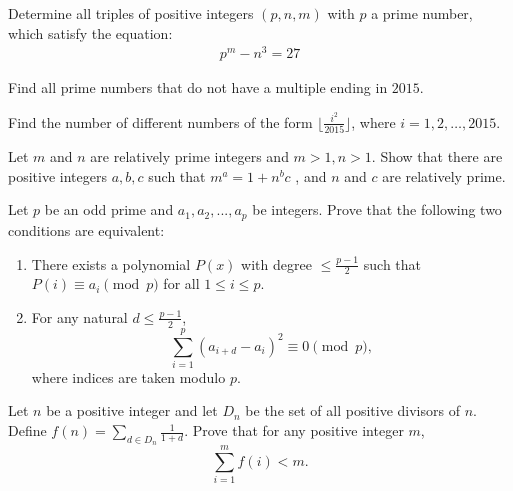 \documentclass[problems.tex]{subfile}
\begin{document}
	\begin{problem}[Chile 2016]
		Determine all triples of positive integers $(p, n, m)$ with $p$ a prime number, which satisfy the equation:
		\begin{align*}
			p^m - n^3 = 27
		\end{align*}
	\end{problem}

	\begin{problem}
		Find all prime numbers that do not have a multiple ending in $2015$.
	\end{problem}

	\begin{problem}[Chile 2016]
		Find the number of different numbers of the form $\lfloor\frac{i^2}{2015}\rfloor$, where $i=1,2,\dots,2015$.
	\end{problem}

	\begin{problem}
		Let $m$ and $n$ are relatively prime integers and $m>1,n>1$. Show that there are positive integers $a,b,c$ such that $m^a=1+n^bc$ , and $n$ and $c$ are relatively prime. %
	\end{problem}

	\begin{problem}
		Let $p$ be an odd prime and $a_1, a_2,...,a_p$ be integers. Prove that the following two conditions are equivalent:
		\begin{enumerate}
			\item There exists a polynomial $P(x)$ with degree $\leq \frac{p-1}{2}$ such that $P(i) \equiv a_i \pmod p$ for all $1 \leq i \leq p$.
			\item For any natural $d \leq \frac{p-1}{2}$,
			$$ \sum_{i=1}^p (a_{i+d} - a_i )^2 \equiv 0 \pmod p,$$
			where indices are taken modulo $p$.
		\end{enumerate}
	\end{problem}

	\begin{problem}
		Let $n$ be a positive integer and let $D_n$ be the set of all positive divisors of $n$. Define $f(n)=\sum\limits_{d\in D_n}{\frac{1}{1+d}}$.
		Prove that for any positive integer $m$, $$\sum_{i=1}^{m}{f(i)} <m.$$
	\end{problem}
\end{document}
